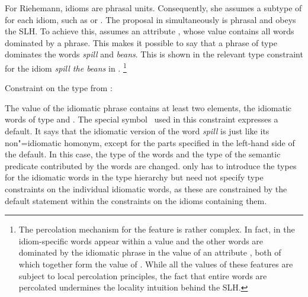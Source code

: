 \documentclass[output=paper
                ,modfonts
                ,nonflat
	        ,collection
	        ,collectionchapter
	        ,collectiontoclongg
 	        ,biblatex
                ,babelshorthands
                ,newtxmath
                ,draftmode
                ,colorlinks, citecolor=brown
]{./langsci/langscibook}
\begin{document}
For Riehemann, idioms are phrasal units. 
Consequently, she assumes a subtype of  for each idiom, such as  or .
The proposal in \citet{Riehemann2001a} simultaneously is phrasal and obeys the SLH. To achieve this, \citet{Riehemann2001a} assumes an attribute , whose value contains all words dominated by a phrase. This makes it possible to say that a phrase of type  dominates the words \emph{spill} and \emph{beans}. This is shown in the relevant type constraint for the idiom \emph{spill the beans} in .%
\footnote{The percolation mechanism for the feature  is rather complex. In fact, in \cite[Section 5.2.1]{Riehemann2001a} the idiom-specific words appear within a  value and the other words are dominated by the idiomatic phrase in the value of an attribute , both of which together form the value of . While all the values of these features are subject to local percolation principles, the fact that entire words are percolated undermines the locality intuition behind the SLH.}


\vbox{
\ea Constraint on the type  from \citet[185]{Riehemann2001a}:\label{sr-spillbeans}\\
\z 
}

The  value of the idiomatic phrase contains at least two elements, the idiomatic words of type  and . 
The special symbol \srdefault\ used in this constraint expresses a default. It says that the idiomatic version of the word \emph{spill} is just like its non"=idiomatic homonym, except for the parts specified in the left-hand side of the default. 
In this case, the type of the words and the type of the semantic predicate contributed by the words are changed. 
\citet{Riehemann2001a} only has to introduce the types for the idiomatic words in the type hierarchy but need not specify type constraints on the individual idiomatic words, as these are constrained by the default statement within the constraints on the idioms containing them.
\end{document}
